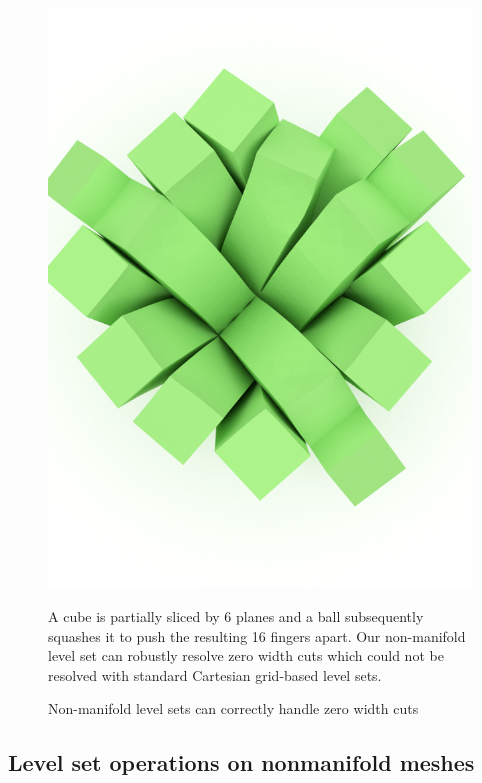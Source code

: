 \begin{figure}
\includegraphics[width=.46\columnwidth]{chapter_nonmanifoldlevelsets/images/ball_drop_zero_width_160.png}

\caption{Non-manifold level sets can correctly handle zero width cuts}{A cube is partially sliced by 6 planes and a ball
  subsequently squashes it to push the resulting 16 fingers apart. Our
  non-manifold level set can robustly resolve zero width cuts which
  could not be resolved with standard Cartesian grid-based level sets.}
\label{fig:zero-width}

\end{figure}



\subsection{Level set operations on nonmanifold meshes}
\label{sec:levelsetalgorithms}

